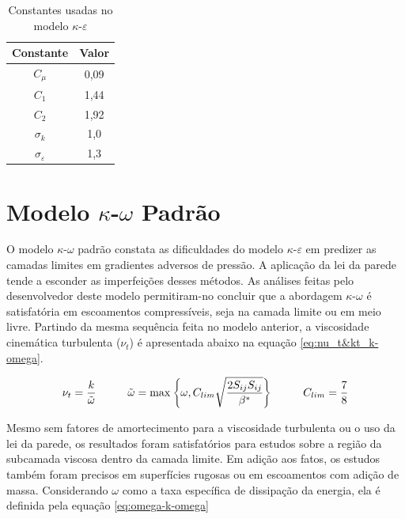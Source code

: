 \begin{table}[ht]
\centering
\caption[Constantes usadas no modelo $\kappa$-$\varepsilon$ \cite{JONES1972301}]{Constantes usadas no modelo $\kappa$-$\varepsilon$ \cite{JONES1972301}}
\vspace{0.5cm}
\begin{tabular}{c|c}
 
Constante & Valor \\
\hline
$C_{\mu}$ & 0,09 \\
$C_{1}$ & 1,44 \\
$C_{2}$ & 1,92 \\
$\sigma_{k}$ & 1,0 \\
$\sigma_{\varepsilon}$ & 1,3

\end{tabular}
\label{tab:tabela-constantes-k-epsilon}
\end{table}

\section{Modelo \texorpdfstring{$\kappa$-$\omega$}{k-w} Padrão}

O modelo $\kappa$-$\omega$ padrão \cite{Wilcox1988ReassessmentOT,Wilcox2006,Wilcox2008} constata as dificuldades do modelo $\kappa$-$\varepsilon$ em predizer as camadas limites em gradientes adversos de pressão. A aplicação da lei da parede tende a esconder as imperfeições desses métodos. As análises feitas pelo desenvolvedor deste modelo permitiram-no concluir que a abordagem $\kappa$-$\omega$ é satisfatória em escoamentos compressíveis, seja na camada limite ou em meio livre. Partindo da mesma sequência feita no modelo anterior, a viscosidade cinemática turbulenta ($\nu_t$) é apresentada abaixo na equação \ref{eq:nu_t&kt_k-omega}.

\begin{equation}
    \nu_t = \frac{k}{\tilde{\omega}}
   	\hspace{1.0cm}
    \tilde{\omega} = \max{\left\lbrace \omega, C_{lim}\sqrt{\frac{2 S_{ij}S_{ij}}{\beta^*}}\right\rbrace}
    \hspace{1.0cm}
    C_{lim} = \frac{7}{8}
    \label{eq:nu_t&kt_k-omega}
\end{equation}

Mesmo sem fatores de amortecimento para a viscosidade turbulenta ou o uso da lei da parede, os resultados foram satisfatórios para estudos sobre a região da subcamada viscosa dentro da camada limite. Em adição aos fatos, os estudos também foram precisos em superfícies rugosas ou em escoamentos com adição de massa. Considerando $\omega$ como a taxa específica de dissipação da energia, ela é definida pela equação \ref{eq:omega-k-omega}

